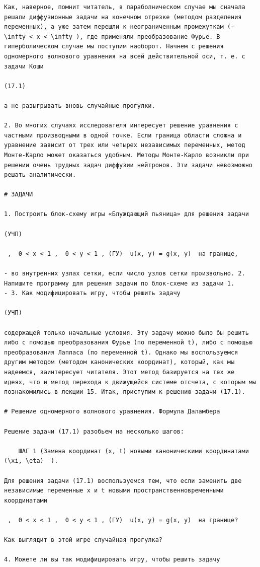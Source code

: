 \documentclass[
  ukrainian,
]{article}
\begin{document}
\begin{verbatim}
Как, наверное, помнит читатель, в параболническом случае мы сначала решали диффузионные задачи на конечном отрезке (методом разделения переменных), а уже затем перешли к неограниченным промежуткам (—  \infty < x < \infty ), где применяли преобразование Фурье. В гиперболическом случае мы поступим наоборот. Начнем с решения одномерного волнового уравнения на всей действительной оси, т. е. с задачи Коши

(17.1)

а не разыгрывать вновь случайные прогулки.

2. Во многих случаях исследователя интересует решение уравнения с частными производными в одной точке. Если граница области сложна и уравнение зависит от трех или четырех независимых переменных, метод Монте-Карло может оказаться удобным. Методы Монте-Карло возникли при решении очень трудных задач диффузии нейтронов. Эти задачи невозможно решать аналитически.

# ЗАДАЧИ

1. Построить блок-схему игры «Блуждающий пьяница» для решения задачи

(УЧП)

 ,  0 < x < 1 ,  0 < y < 1 , (ГУ)  u(x, y) = g(x, y)  на границе,

- во внутренних узлах сетки, если число узлов сетки произвольно. 2. Напишите программу для решения задачи по блок-схеме из задачи 1.
- 3. Как модифицировать игру, чтобы решить задачу

(УЧП) 

содержащей только начальные условия. Эту задачу можно было бы решить либо с помощью преобразования Фурье (по переменной t), либо с помощью преобразования Лапласа (по переменной t). Однако мы воспользуемся другим методом (методом канонических координат), который, как мы надеемся, заинтересует читателя. Этот метод базируется на тех же идеях, что и метод перехода к движущейся системе отсчета, с которым мы познакомились в лекции 15. Итак, приступим к решению задачи (17.1).

# Решение одномерного волнового уравнения. Формула Даламбера

Решение задачи (17.1) разобьем на несколько шагов:

    ШАГ 1 (Замена координат (x, t) новыми каноническими координатами   (\xi, \eta)  ).

Для решения задачи (17.1) воспользуемся тем, что если заменить две независимые переменные x и t новыми пространственновременными координатами

 ,  0 < x < 1 ,  0 < y < 1 , (ГУ)  u(x, y) = g(x, y)  на границе?

Как выглядит в этой игре случайная прогулка?

4. Можете ли вы так модифицировать игру, чтобы решить задачу
\end{verbatim}
\end{document}
